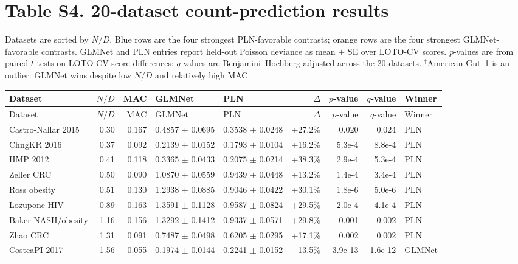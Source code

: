 \section*{Table S4. 20-dataset count-prediction results}
Datasets are sorted by $N/D$.
Blue rows are the four strongest PLN-favorable contrasts; orange rows are the four strongest GLMNet-favorable contrasts.
GLMNet and PLN entries report held-out Poisson deviance as mean $\pm$ SE over LOTO-CV scores.
$p$-values are from paired $t$-tests on LOTO-CV score differences; $q$-values are Benjamini--Hochberg adjusted across the 20 datasets.
$^\dagger$American Gut~1 is an outlier: GLMNet wins despite low $N/D$ and relatively high MAC.
\footnotesize
\setlength{\tabcolsep}{2.7pt}
\setlength{\LTleft}{0pt}
\setlength{\LTright}{0pt}
\begin{longtable}{p{}rrp{}p{}rrrp{}}
\toprule
Dataset & $N/D$ & MAC & GLMNet & PLN & $\Delta$ & $p$-value & $q$-value & Winner \\
\midrule
\endfirsthead
\toprule
Dataset & $N/D$ & MAC & GLMNet & PLN & $\Delta$ & $p$-value & $q$-value & Winner \\
\midrule
\endhead
Castro-Nallar 2015 & 0.30 & 0.167 & 0.4857 $\pm$ 0.0695 & 0.3538 $\pm$ 0.0248 & +27.2\% & 0.020 & 0.024 & PLN \\
ChngKR 2016 & 0.37 & 0.092 & 0.2139 $\pm$ 0.0152 & 0.1793 $\pm$ 0.0104 & +16.2\% & 5.3e-4 & 8.8e-4 & PLN \\
\rowcolor{blue!8} HMP 2012 & 0.41 & 0.118 & 0.3365 $\pm$ 0.0433 & 0.2075 $\pm$ 0.0214 & +38.3\% & 2.9e-4 & 5.3e-4 & PLN \\
Zeller CRC & 0.50 & 0.090 & 1.0870 $\pm$ 0.0559 & 0.9439 $\pm$ 0.0448 & +13.2\% & 1.4e-4 & 3.4e-4 & PLN \\
\rowcolor{blue!8} Ross obesity & 0.51 & 0.130 & 1.2938 $\pm$ 0.0885 & 0.9046 $\pm$ 0.0422 & +30.1\% & 1.8e-6 & 5.0e-6 & PLN \\
\rowcolor{blue!8} Lozupone HIV & 0.89 & 0.163 & 1.3591 $\pm$ 0.1128 & 0.9587 $\pm$ 0.0824 & +29.5\% & 2.0e-4 & 4.1e-4 & PLN \\
\rowcolor{blue!8} Baker NASH/obesity & 1.16 & 0.156 & 1.3292 $\pm$ 0.1412 & 0.9337 $\pm$ 0.0571 & +29.8\% & 0.001 & 0.002 & PLN \\
Zhao CRC & 1.31 & 0.091 & 0.7487 $\pm$ 0.0498 & 0.6205 $\pm$ 0.0295 & +17.1\% & 0.002 & 0.002 & PLN \\
\rowcolor{orange!10} CosteaPI 2017 & 1.56 & 0.055 & 0.1974 $\pm$ 0.0144 & 0.2241 $\pm$ 0.0152 & $-$13.5\% & 3.9e-13 & 1.6e-12 & GLMNet \\

\end{longtable}
